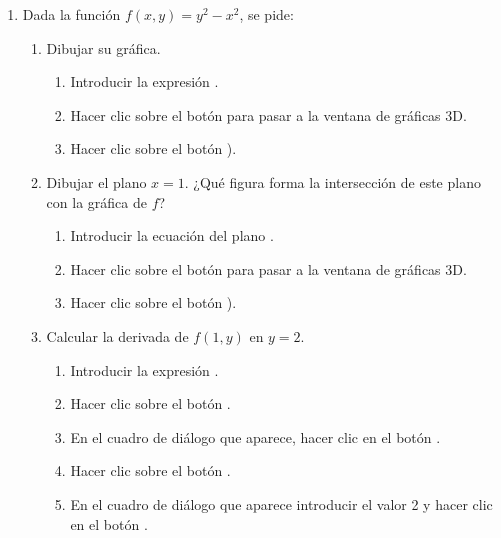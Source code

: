 \begin{enumerate}[leftmargin=*]
\item Dada la función $f(x,y)=y^2-x^2$, se pide:
\begin{enumerate}
\item Dibujar su gráfica. 
\begin{indicacion}
\begin{enumerate}
\item Introducir la expresión .
\item Hacer clic sobre el botón  para pasar a la ventana de gráficas 3D.
\item Hacer clic sobre el botón ).
\end{enumerate}
\end{indicacion}


\item Dibujar el plano $x=1$. ¿Qué figura forma la intersección de este plano con la gráfica de $f$?
\begin{indicacion}
\begin{enumerate}
\item Introducir la ecuación del plano .
\item Hacer clic sobre el botón  para pasar a la ventana de gráficas 3D.
\item Hacer clic sobre el botón ).
\end{enumerate}
\end{indicacion}

\item Calcular la derivada de $f(1,y)$ en $y=2$.
\begin{indicacion}
\begin{enumerate}
\item Introducir la expresión .
\item Hacer clic sobre el botón .
\item En el cuadro de diálogo que aparece, hacer clic en el botón .
\item Hacer clic sobre el botón .
\item En el cuadro de diálogo que aparece introducir el valor 2 y hacer clic en el botón .
\end{enumerate}
\end{indicacion}


\end{enumerate}
\end{enumerate}
